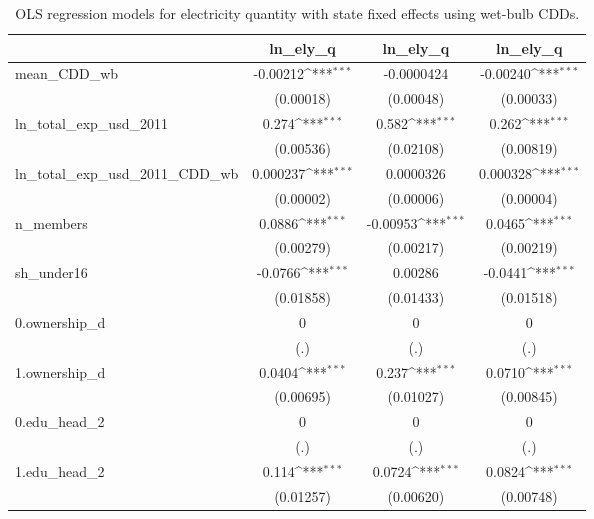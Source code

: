 \begin{table}[htbp]\centering\footnotesize{
\def\sym#1{\ifmmode^{#1}\else\(^{#1}\)\fi}
\caption{OLS regression models for electricity quantity with state fixed effects using wet-bulb CDDs. \label{ely_reg_wb}}
\begin{tabular}{l*{3}{c}}
\hline\hline
            &\multicolumn{1}{c}{ln_ely_q}&\multicolumn{1}{c}{ln_ely_q}&\multicolumn{1}{c}{ln_ely_q}\\
\hline
mean_CDD_wb &    -0.00212\sym{***}&  -0.0000424         &    -0.00240\sym{***}\\
            &   (0.00018)         &   (0.00048)         &   (0.00033)         \\
ln_total_exp_usd_2011&       0.274\sym{***}&       0.582\sym{***}&       0.262\sym{***}\\
            &   (0.00536)         &   (0.02108)         &   (0.00819)         \\
ln_total_exp_usd_2011_CDD_wb&    0.000237\sym{***}&   0.0000326         &    0.000328\sym{***}\\
            &   (0.00002)         &   (0.00006)         &   (0.00004)         \\
n_members   &      0.0886\sym{***}&    -0.00953\sym{***}&      0.0465\sym{***}\\
            &   (0.00279)         &   (0.00217)         &   (0.00219)         \\
sh_under16  &     -0.0766\sym{***}&     0.00286         &     -0.0441\sym{***}\\
            &   (0.01858)         &   (0.01433)         &   (0.01518)         \\
0.ownership_d&           0         &           0         &           0         \\
            &         (.)         &         (.)         &         (.)         \\
1.ownership_d&      0.0404\sym{***}&       0.237\sym{***}&      0.0710\sym{***}\\
            &   (0.00695)         &   (0.01027)         &   (0.00845)         \\
0.edu_head_2&           0         &           0         &           0         \\
            &         (.)         &         (.)         &         (.)         \\
1.edu_head_2&       0.114\sym{***}&      0.0724\sym{***}&      0.0824\sym{***}\\
            &   (0.01257)         &   (0.00620)         &   (0.00748)         \\

\end{tabular}}
\end{table}
